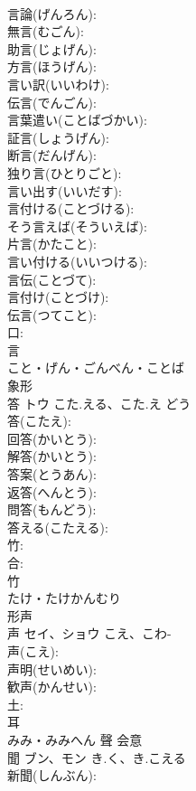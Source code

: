 \documentclass[8pt]{extreport}
\begin{document}
\begin{CJK}{UTF8}{min}
\\	言論(げんろん): 
\\	無言(むごん): 
\\	助言(じょげん): 
\\	方言(ほうげん): 
\\	言い訳(いいわけ): 
\\	伝言(でんごん): 
\\	言葉遣い(ことばづかい): 
\\	証言(しょうげん): 
\\	断言(だんげん): 
\\	独り言(ひとりごと): 
\\	言い出す(いいだす): 
\\	言付ける(ことづける): 
\\	そう言えば(そういえば): 
\\	片言(かたこと): 
\\	言い付ける(いいつける): 
\\	言伝(ことづて): 
\\	言付け(ことづけ): 
\\	伝言(つてこと): 
\\	口: 
\\	言	
\\	こと・げん・ごんべん・ことば	
\\	象形 
\\	答	トウ	こた.える、こた.え	どう	
\\	答(こたえ): 
\\	回答(かいとう): 
\\	解答(かいとう): 
\\	答案(とうあん): 
\\	返答(へんとう): 
\\	問答(もんどう): 
\\	答える(こたえる): 
\\	竹: 
\\	合: 
\\	竹	
\\	たけ・たけかんむり	
\\	形声 
\\	声	セイ、ショウ	こえ、こわ-		
\\	声(こえ): 
\\	声明(せいめい): 
\\	歓声(かんせい): 
\\	土: 
\\	耳	
\\	みみ・みみへん	聲	会意 
\\	聞	ブン、モン	き.く、き.こえる		
\\	新聞(しんぶん): 

\end{CJK}
\end{document}
